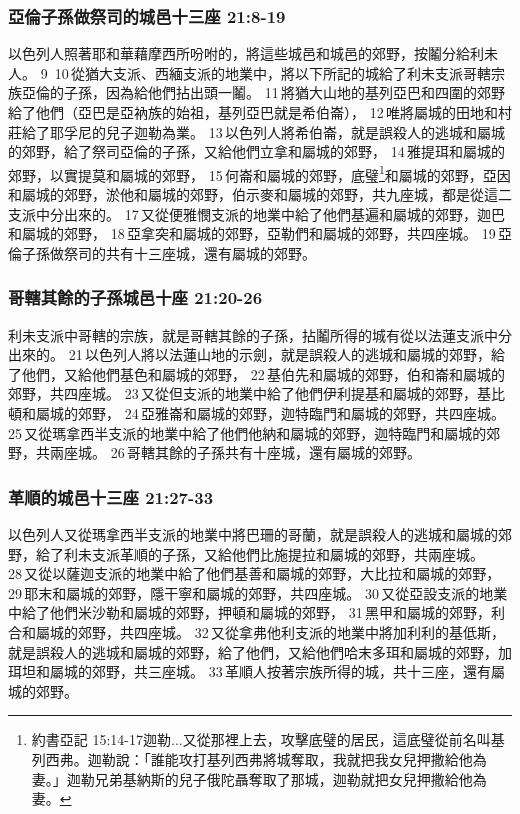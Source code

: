 \subsubsection{亞倫子孫做祭司的城邑十三座 21:8-19}
以色列人照著耶和華藉摩西所吩咐的，將這些城邑和城邑的郊野，按鬮分給利未人。 9  10 從猶大支派、西緬支派的地業中，將以下所記的城給了利未支派哥轄宗族亞倫的子孫，因為給他們拈出頭一鬮。 11 將猶大山地的基列亞巴和四圍的郊野給了他們（亞巴是亞衲族的始祖，基列亞巴就是希伯崙）， 12 唯將屬城的田地和村莊給了耶孚尼的兒子迦勒為業。 13 以色列人將希伯崙，就是誤殺人的逃城和屬城的郊野，給了祭司亞倫的子孫，又給他們立拿和屬城的郊野， 14 雅提珥和屬城的郊野，以實提莫和屬城的郊野， 15 何崙和屬城的郊野，底璧\footnote{約書亞記 15:14-17迦勒...又從那裡上去，攻擊底璧的居民，這底璧從前名叫基列西弗。迦勒說：「誰能攻打基列西弗將城奪取，我就把我女兒押撒給他為妻。」迦勒兄弟基納斯的兒子俄陀聶奪取了那城，迦勒就把女兒押撒給他為妻。}和屬城的郊野，亞因和屬城的郊野，淤他和屬城的郊野，伯示麥和屬城的郊野，共九座城，都是從這二支派中分出來的。 17 又從便雅憫支派的地業中給了他們基遍和屬城的郊野，迦巴和屬城的郊野， 18 亞拿突和屬城的郊野，亞勒們和屬城的郊野，共四座城。 19 亞倫子孫做祭司的共有十三座城，還有屬城的郊野。

\subsubsection{哥轄其餘的子孫城邑十座 21:20-26}
利未支派中哥轄的宗族，就是哥轄其餘的子孫，拈鬮所得的城有從以法蓮支派中分出來的。 21 以色列人將以法蓮山地的示劍，就是誤殺人的逃城和屬城的郊野，給了他們，又給他們基色和屬城的郊野， 22 基伯先和屬城的郊野，伯和崙和屬城的郊野，共四座城。 23 又從但支派的地業中給了他們伊利提基和屬城的郊野，基比頓和屬城的郊野， 24 亞雅崙和屬城的郊野，迦特臨門和屬城的郊野，共四座城。 25 又從瑪拿西半支派的地業中給了他們他納和屬城的郊野，迦特臨門和屬城的郊野，共兩座城。 26 哥轄其餘的子孫共有十座城，還有屬城的郊野。

\subsubsection{革順的城邑十三座 21:27-33}
以色列人又從瑪拿西半支派的地業中將巴珊的哥蘭，就是誤殺人的逃城和屬城的郊野，給了利未支派革順的子孫，又給他們比施提拉和屬城的郊野，共兩座城。 28 又從以薩迦支派的地業中給了他們基善和屬城的郊野，大比拉和屬城的郊野， 29 耶末和屬城的郊野，隱干寧和屬城的郊野，共四座城。 30 又從亞設支派的地業中給了他們米沙勒和屬城的郊野，押頓和屬城的郊野， 31 黑甲和屬城的郊野，利合和屬城的郊野，共四座城。 32 又從拿弗他利支派的地業中將加利利的基低斯，就是誤殺人的逃城和屬城的郊野，給了他們，又給他們哈末多珥和屬城的郊野，加珥坦和屬城的郊野，共三座城。 33 革順人按著宗族所得的城，共十三座，還有屬城的郊野。

